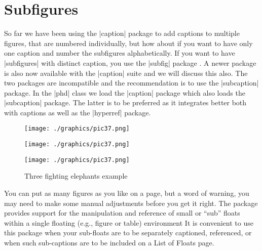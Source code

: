 \chapter{Subfigures}

So far we have been using the |caption| package to add captions to multiple figures, that are numbered individually, but how about if you want to have only one caption and number the subfigures alphabetically. If you want to have |subfigures| with distinct caption, you use the |subfig| package \citep{subfigure}. A newer package  is also now available with the |caption| suite and we will discuss this also. The two packages are incompatible and the recommendation is to use the |subcaption| package. In the |phd| class we load the |caption| package which also loads the |subcaption| package. The latter is to be preferred as it integrates better both with captions as well as the |hyperref| package.

\begin{figure}[h]
\centering
\begin{minipage}[b]{.3\linewidth}
\texttt{[image: ./graphics/pic37.png]}\hspace{1em}
\label{fig:1a}
\end{minipage}\hspace{1em}
\begin{minipage}[b]{.3\linewidth}
\texttt{[image: ./graphics/pic37.png]}\hspace{1em}
\label{fig:1b}
\end{minipage}\hspace{1em}
\begin{minipage}[b]{.3\linewidth}
\texttt{[image: ./graphics/pic37.png]}\hspace{1em}
\label{fig:1c}
\end{minipage}
\caption{Three fighting elephants example}
\end{figure}

You can put as many figures as you like on a page, but a word of warning, you may need to make some manual adjustments before you get it right. The package provides support for the manipulation and reference of small or \enquote{sub} floats within a single floating (e.g., figure or table) environment It is convenient to use this
package when your sub-floats are to be separately captioned, referenced, or when such
sub-captions are to be included on a List of Floats page.

